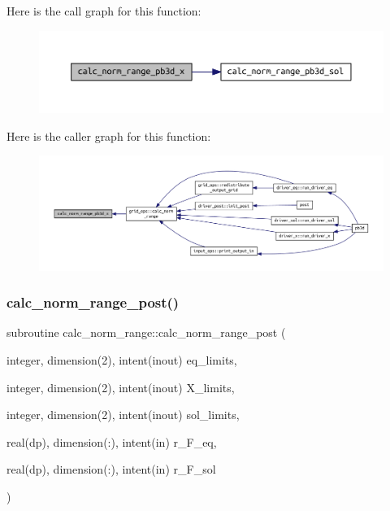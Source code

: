 Here is the call graph for this function\+:
\nopagebreak
\begin{figure}[H]
\begin{center}
\leavevmode
\includegraphics[width=350pt]{grid__ops_8f90_a242e1c26e16f9cd4b7604de7a90a7472_cgraph}
\end{center}
\end{figure}
Here is the caller graph for this function\+:
\nopagebreak
\begin{figure}[H]
\begin{center}
\leavevmode
\includegraphics[width=350pt]{grid__ops_8f90_a242e1c26e16f9cd4b7604de7a90a7472_icgraph}
\end{center}
\end{figure}
\mbox{\label{grid__ops_8f90_ad037c191ae770bd79529506953f0e307}} 
\subsubsection{\texorpdfstring{calc\+\_\+norm\+\_\+range\+\_\+post()}{calc\_norm\_range\_post()}}
{\footnotesize\ttfamily subroutine calc\+\_\+norm\+\_\+range\+::calc\+\_\+norm\+\_\+range\+\_\+post (\begin{DoxyParamCaption}\item[{integer, dimension(2), intent(inout)}]{eq\+\_\+limits,  }\item[{integer, dimension(2), intent(inout)}]{X\+\_\+limits,  }\item[{integer, dimension(2), intent(inout)}]{sol\+\_\+limits,  }\item[{real(dp), dimension(\+:), intent(in)}]{r\+\_\+\+F\+\_\+eq,  }\item[{real(dp), dimension(\+:), intent(in)}]{r\+\_\+\+F\+\_\+sol }\end{DoxyParamCaption})}



